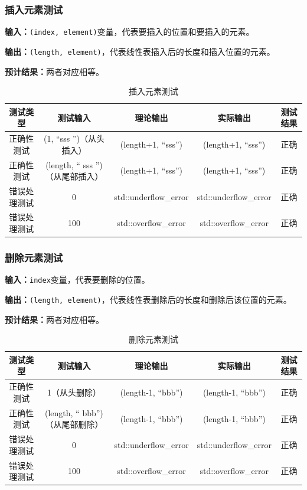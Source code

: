\subsubsection{插入元素测试}
\textbf{输入：}\texttt{(index, element)}变量，代表要插入的位置和要插入的元素。
\par
\textbf{输出：}\texttt{(length, element)}，代表线性表插入后的长度和插入位置的元素。
\par
\textbf{预计结果：}两者对应相等。
\begin{table}[h]
    \centering
    \caption{插入元素测试}
    \begin{tabular}{@{}ccccc@{}}
        \toprule
        \multicolumn{1}{c}{测试类型}    & \multicolumn{1}{c}{测试输入} & \multicolumn{1}{c}{理论输出} & \multicolumn{1}{c}{实际输出} &
        \multicolumn{1}{c}{测试结果} \\ \midrule
        \multicolumn{1}{c|}{正确性测试}  & (1, ``sss '')（从头插入）&(length+1, ``sss'')&(length+1, ``sss'')&正确\\
        \multicolumn{1}{c|}{正确性测试}  & (length, `` sss '')（从尾部插入）&(length+1, ``sss'')&(length+1, ``sss'')&正确\\
        \multicolumn{1}{c|}{错误处理测试} & 0& std::underflow\_error& std::underflow\_error& 正确\\
        \multicolumn{1}{c|}{错误处理测试} & 100& std::overflow\_error& std::overflow\_error& 正确\\ \bottomrule
    \end{tabular}
    \label{tab:inserttest2}
\end{table}

\subsubsection{删除元素测试}
\textbf{输入：}\texttt{index}变量，代表要删除的位置。
\par
\textbf{输出：}\texttt{(length, element)}，代表线性表删除后的长度和删除后该位置的元素。
\par
\textbf{预计结果：}两者对应相等。
\begin{table}[h]
    \centering
    \caption{删除元素测试}
    \begin{tabular}{@{}ccccc@{}}
        \toprule
        \multicolumn{1}{c}{测试类型}    & \multicolumn{1}{c}{测试输入} & \multicolumn{1}{c}{理论输出} & \multicolumn{1}{c}{实际输出} &
        \multicolumn{1}{c}{测试结果} \\ \midrule
        \multicolumn{1}{c|}{正确性测试}  & 1（从头删除）&(length-1, ``bbb'')&(length-1, ``bbb'')&正确\\
        \multicolumn{1}{c|}{正确性测试}  & (length, `` bbb'')（从尾部删除）&(length-1, ``bbb'')&(length-1, ``bbb'')&正确\\
        \multicolumn{1}{c|}{错误处理测试} & 0& std::underflow\_error& std::underflow\_error& 正确\\
        \multicolumn{1}{c|}{错误处理测试} & 100& std::overflow\_error& std::overflow\_error& 正确\\ \bottomrule
    \end{tabular}
    \label{tab:deletetest2}
\end{table}



